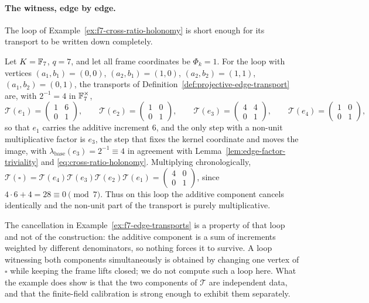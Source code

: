 \paragraph{The witness, edge by edge.}
The loop of Example~\ref{ex:f7-cross-ratio-holonomy} is short enough for its
transport to be written down completely.

\begin{example}
\label{ex:f7-edge-transports}
Let $K=\mathbb{F}_7$, $q=7$, and let all frame coordinates be $\Phi_k=1$.  For the loop
with vertices $(a_1,b_1)=(0,0)$, $(a_2,b_1)=(1,0)$, $(a_2,b_2)=(1,1)$,
$(a_1,b_2)=(0,1)$, the transports of
Definition~\ref{def:projective-edge-transport} are, with $2^{-1}=4$ in
$\mathbb{F}_7^{\times}$,
\[
  \mathcal T(e_1)=\begin{pmatrix}1&6\\0&1\end{pmatrix},
  \qquad
  \mathcal T(e_2)=\begin{pmatrix}1&0\\0&1\end{pmatrix},
  \qquad
  \mathcal T(e_3)=\begin{pmatrix}4&4\\0&1\end{pmatrix},
  \qquad
  \mathcal T(e_4)=\begin{pmatrix}1&0\\0&1\end{pmatrix},
\]
so that $e_1$ carries the additive increment $6$, and the only step with a
non-unit multiplicative factor is $e_3$, the step that fixes the kernel
coordinate and moves the image, with $\lambda_{\mathrm{base}}(e_3)=2^{-1}\equiv4$
in agreement with Lemma~\ref{lem:edge-factor-triviality} and
\eqref{eq:cross-ratio-holonomy}.
Multiplying chronologically, $\mathcal T(\square)=\mathcal T(e_4)\mathcal T(e_3)
\mathcal T(e_2)\mathcal T(e_1)=\begin{pmatrix}4&0\\0&1\end{pmatrix}$, since
$4\cdot6+4=28\equiv0\pmod 7$.  Thus on this loop the additive component cancels
identically and the non-unit part of the transport is purely multiplicative.
\end{example}

\begin{remark}
\label{rem:single-loop-components}
The cancellation in Example~\ref{ex:f7-edge-transports} is a property of that
loop and not of the construction: the additive component is a sum of increments
weighted by different denominators, so nothing forces it to survive.  A loop
witnessing both components simultaneously is obtained by changing one vertex of
$\square$ while keeping the frame lifts closed; we do not compute such a loop
here.  What the example does show is that the two components of
$\mathcal T$ are independent data, and that the finite-field calibration is
strong enough to exhibit them separately.
\end{remark}

